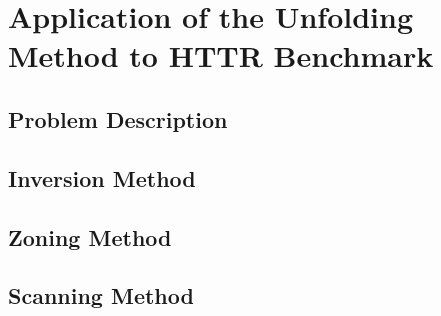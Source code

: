 \section{Application of the Unfolding Method to HTTR Benchmark}
\label{sec:httr_unfolding}
\subsection{Problem Description}

\subsection{Inversion Method}

\subsection{Zoning Method}

\subsection{Scanning Method}
